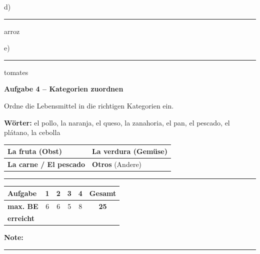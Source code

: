 \documentclass[11pt, a4paper]{article}
\newcommand{\fachfarbe}{spanisch}
\newcommand{\punktebox}[1]{\hfill\fbox{\small \_/#1}}
\newcommand{\luecke}[1]{\rule{#1}{0.4pt}}
\newenvironment{aufgabe}[1]{%
    \needspace{5\baselineskip}%
    \nopagebreak[4]%
    \vspace{10pt}
    \noindent\textbf{\textcolor{\fachfarbe}{Aufgabe #1}}
    \nopagebreak[4]%
    \vspace{5pt}
    \nopagebreak[4]%
    \begin{list}{}{\leftmargin=0pt}
    \item[]
}{%
    \end{list}
}
\begin{document}
\noindent
d) \luecke{3.5cm} arroz

\vspace{0.8em}

\noindent
e) \luecke{3.5cm} tomates

\vspace{15pt}


\begin{aufgabe}{4 -- Kategorien zuordnen}
Ordne die Lebensmittel in die richtigen Kategorien ein. \punktebox{8}
\end{aufgabe}

\begin{hinweis}
\textbf{Wörter:} el pollo, la naranja, el queso, la zanahoria, el pan, el pescado, el plátano, la cebolla
\end{hinweis}

\vspace{0.5em}

\noindent
\begin{tabularx}{\textwidth}{|X|X|}
\hline
\textbf{La fruta} (Obst) & \textbf{La verdura} (Gemüse) \\[2.5em]
\hline
\textbf{La carne / El pescado} & \textbf{Otros} (Andere) \\[2.5em]
\hline
\end{tabularx}


\vspace{25pt}
\hrule
\vspace{10pt}

\noindent
\begin{tabularx}{\textwidth}{|X|c|c|c|c||c|}
\hline
\textbf{Aufgabe} & 1 & 2 & 3 & 4 & \textbf{Gesamt} \\
\hline
\textbf{max. BE} & 6 & 6 & 5 & 8 & \textbf{25} \\
\hline
\textbf{erreicht} & & & & & \\[0.8em]
\hline
\end{tabularx}

\vspace{10pt}

\begin{flushright}
\textbf{Note:} \luecke{2cm}
\end{flushright}
\end{document}
